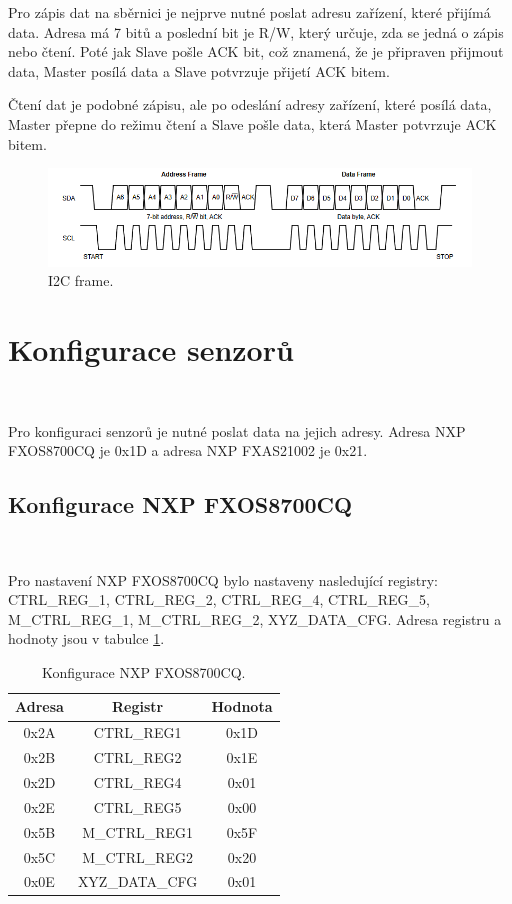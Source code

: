 Pro zápis dat na sběrnici je nejprve nutné poslat adresu zařízení, které přijímá
data. Adresa má 7 bitů a poslední bit je R/W, který určuje, zda se jedná
o zápis nebo čtení. Poté jak Slave pošle ACK bit, což znamená, že je připraven přijmout
data, Master posílá data a Slave potvrzuje přijetí ACK bitem.

Čtení dat je podobné zápisu, ale po odeslání adresy zařízení, které posílá data,
Master přepne do režimu čtení a Slave pošle data, která Master potvrzuje ACK bitem\cite{I2C}.

\begin{figure}[!h]
    \centering
    \includegraphics[width = 0.8\linewidth]{Figures/I2C_FRAME.png}
    \caption{I2C frame\cite{I2C}.}
    \label{fig:I2C_FRAME}
\end{figure}

\section{Konfigurace senzorů}\

Pro konfiguraci senzorů je nutné poslat data na jejich adresy. Adresa NXP FXOS8700CQ
je 0x1D a adresa NXP FXAS21002 je 0x21.

\subsection{Konfigurace NXP FXOS8700CQ}\

Pro nastavení NXP FXOS8700CQ bylo nastaveny nasledující registry: CTRL\_REG\_1, CTRL\_REG\_2,
CTRL\_REG\_4, CTRL\_REG\_5, M\_CTRL\_REG\_1, M\_CTRL\_REG\_2, XYZ\_DATA\_CFG.
Adresa registru a hodnoty jsou v tabulce \ref{tab:FXOS8700CQ}.

\begin{table}[!h]
    \centering
    \begin{tabular}{|c|c|c|}
        \hline
        \textbf{Adresa} & \textbf{Registr} & \textbf{Hodnota} \\
        \hline
        0x2A            & CTRL\_REG1       & 0x1D             \\
        0x2B            & CTRL\_REG2       & 0x1E             \\
        0x2D            & CTRL\_REG4       & 0x01             \\
        0x2E            & CTRL\_REG5       & 0x00             \\
        0x5B            & M\_CTRL\_REG1    & 0x5F             \\
        0x5C            & M\_CTRL\_REG2    & 0x20             \\
        0x0E            & XYZ\_DATA\_CFG   & 0x01             \\
        \hline
    \end{tabular}
    \caption{Konfigurace NXP FXOS8700CQ\cite{FXOS8700CQ}.}
    \label{tab:FXOS8700CQ}
\end{table}

